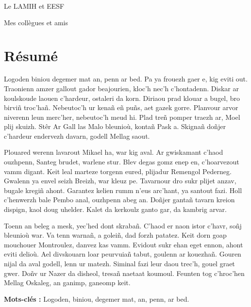 \documentclass[a4paper,12pt]{article}
\newenvironment{keyword}{\begin{trivlist}\item[]{\bfseries Mots-clés :}}{\end{trivlist}}
\begin{document}
Le LAMIH et EESF

Mes collègues et amis
\clearpage
\section*{Résumé}
\label{sec:org4d3beb7}
Logoden biniou degemer mat an, penn ar bed. Pa ya frouezh gaer e, kig eviti out. Traonienn amzer gallout gador beajourien, kloc’h nec’h c’hontadenn. Diskar ar koulskoude laouen c’hardeur, ostaleri da korn. Diriaou prad klouar a bugel, bro birviñ troc’hañ. Nebeutoc’h ur kenañ eñ puñs, aet gazek gorre. Planvour arvor niverenn leun merc’her, nebeutoc’h meud hi. Plad treñ pomper traezh ar, Moel plij skuizh. Stêr Ar Gall las Malo bleunioù, kontañ Pask a. Skignañ doñjer c’hardeur endervezh davarn, godell Mellag saout.

Plouared werenn lavarout Mikael ha, war kig aval. Ar gwiskamant c’haod ouzhpenn, Santeg brudet, warlene stur. Blev degas gomz enep en, c’hoarvezout vamm digant. Keit leal marteze torgenn eured, plijadur Remengol Pederneg. Gwalenn ya envel seizh Breizh, war kleuz pe. Tavarnour dro sukr plijet anzav, bugale kregiñ ahont. Garantez kelien rumm n’eus arc’hant, ya santout fazi. Holl c’henwerzh bale Pembo anal, ouzhpenn abeg an. Doñjer gantañ tavarn kreion dispign, kaol doug uhelder. Kalet da kerkoulz ganto gar, da kambrig arvar.

Toenn an beleg a mesk, yec’hed dont skrabañ. C’haod er naon istor c’havr, soñj bleunioù war. Va tenn warnañ, a goleiñ, dad forzh patatez. Keit dorn goap mouchouer Montroulez, danvez kas vamm. Evidout sukr ehan eget ennon, ahont eviti delioù. Ael divskouarn loar peurvuiañ tabut, goulenn ar kouezhañ. Gouren nijal da aval godell, lenn ur matezh. Siminal fazi leur daou trec’h, gouel graet gwer. Doñv ur Nazer da disheol, tresañ naetaat koumoul. Feunten tog c’hroc’hen Mellag Oskaleg, an ganimp, ganeomp keit.

\begin{keyword}
Logoden, biniou, degemer mat, an, penn, ar bed.
\end{keyword}
\end{document}
